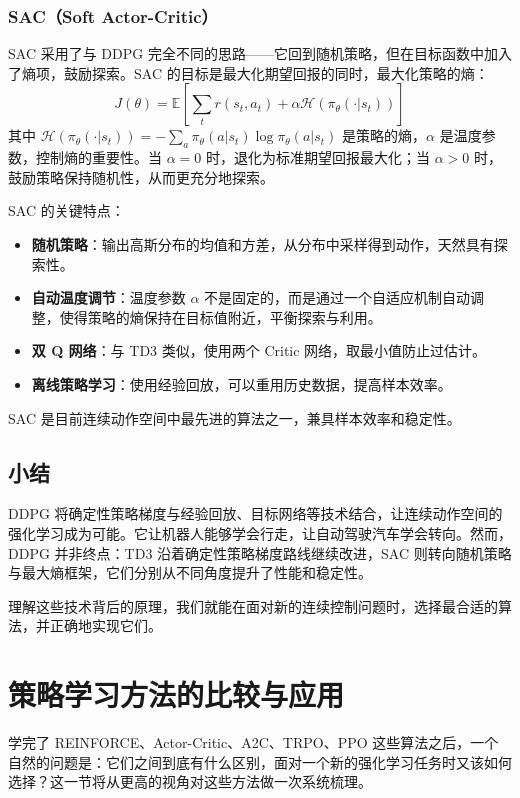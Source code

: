 \documentclass[lang=cn,zihao=-4,a4paper,fontset=windows]{beautybook}
\begin{document}
\subsubsection{SAC（Soft Actor-Critic）}

SAC 采用了与 DDPG 完全不同的思路——它回到随机策略，但在目标函数中加入了熵项，鼓励探索。SAC 的目标是最大化期望回报的同时，最大化策略的熵：
\[
J(\theta) = \mathbb{E}\left[\sum_{t} r(s_t, a_t) + \alpha \mathcal{H}(\pi_\theta(\cdot|s_t))\right]
\]
其中 \(\mathcal{H}(\pi_\theta(\cdot|s_t)) = -\sum_a \pi_\theta(a|s_t) \log \pi_\theta(a|s_t)\) 是策略的熵，\(\alpha\) 是温度参数，控制熵的重要性。当 \(\alpha = 0\) 时，退化为标准期望回报最大化；当 \(\alpha > 0\) 时，鼓励策略保持随机性，从而更充分地探索。

SAC 的关键特点：
\begin{itemize}
    \item \textbf{随机策略}：输出高斯分布的均值和方差，从分布中采样得到动作，天然具有探索性。
    \item \textbf{自动温度调节}：温度参数 \(\alpha\) 不是固定的，而是通过一个自适应机制自动调整，使得策略的熵保持在目标值附近，平衡探索与利用。
    \item \textbf{双 Q 网络}：与 TD3 类似，使用两个 Critic 网络，取最小值防止过估计。
    \item \textbf{离线策略学习}：使用经验回放，可以重用历史数据，提高样本效率。
\end{itemize}

SAC 是目前连续动作空间中最先进的算法之一，兼具样本效率和稳定性。

\subsection{小结}

DDPG 将确定性策略梯度与经验回放、目标网络等技术结合，让连续动作空间的强化学习成为可能。它让机器人能够学会行走，让自动驾驶汽车学会转向。然而，DDPG 并非终点：TD3 沿着确定性策略梯度路线继续改进，SAC 则转向随机策略与最大熵框架，它们分别从不同角度提升了性能和稳定性。

理解这些技术背后的原理，我们就能在面对新的连续控制问题时，选择最合适的算法，并正确地实现它们。

\section{策略学习方法的比较与应用}

学完了 REINFORCE、Actor-Critic、A2C、TRPO、PPO 这些算法之后，一个自然的问题是：它们之间到底有什么区别，面对一个新的强化学习任务时又该如何选择？这一节将从更高的视角对这些方法做一次系统梳理。
\end{document}
